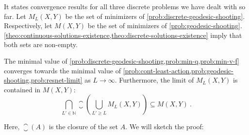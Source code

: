 It states convergence results for all three discrete problems we have dealt with so far.
Let $M_L(X, Y)$ be the set of minimizers of \cref{prob:discrete-geodesic-shooting}.
Respectively, let $M(X, Y)$ be the set of minimizers of \cref{prob:geodesic-shooting}.
\cref{theo:continuous-solutions-existence,theo:discrete-solutions-existence} imply that both sets are non-empty.
\begin{theorem}
	\label{theo:problem-convergence}
	The minimal value of \cref{prob:discrete-geodesic-shooting,prob:min-q,prob:min-v-f} converges towards the minimal value of \cref{prob:cont-least-action,prob:geodesic-shooting,prob:resnet-limit} as $L \rightarrow \infty$.
	Furthermore, the limit of $M_L(X, Y)$ is contained in $M(X, Y)$:
	\begin{equation}
	\label{eq:limit-adherence}
		\bigcap_{L' \in \mathbb{N}} \closure\left(\bigcup_{L' \geq L} M_L(X, Y)\right) \subseteq M(X, Y) \ .
	\end{equation}
\end{theorem}
Here, $\closure (A)$ is the closure of the set $A$.
We will sketch the proof:
